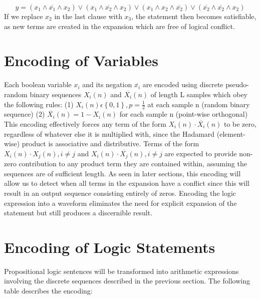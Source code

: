 \documentclass[reqno]{amsart}
\theoremstyle{definition}
\theoremstyle{remark}
\begin{document}
\begin{equation}
y = (x_1\wedge\overline{x_1}\wedge x_2) \vee (x_1 \wedge \overline{x_2} \wedge x_2) \vee (x_1\wedge x_2\wedge \overline{x_2} ) \vee (\overline{x_2}\wedge \overline{x_2}\wedge x_2)
\end{equation}
\newline
\noindent
If we replace $x_2$ in the last clause with $x_3$, the statement then becomes satisfiable, as new terms are created in the expansion which are free of logical conflict.


\section{Encoding of Variables}
\noindent
Each boolean variable $x_i$ and its negation $\overline{x_i}$ are encoded using discrete pseudo-random binary 
sequences $X_i(n)$ and $\overline{X_i}(n)$ of length L samples which obey the following
rules: \newline\newline
(1) $X_i(n) \epsilon\left \{ 0,1 \right \}, p=\frac{1}{2}$ at each sample n (random binary sequence) \newline
(2) $\overline{X_i}(n) =  1-X_i(n)$  for each sample n (point-wise orthogonal) \newline
\newline
\noindent
This encoding effectively forces any term of the form $X_i(n) \cdot \overline{X_i}(n)$ to be zero, regardless
of whatever else it is multiplied with, since the Hadamard (element-wise) product is associative and distributive. Terms of the form $X_i(n) \cdot X_j(n), i \neq j$ and $X_i(n) \cdot \overline{X_j}(n), i \neq j$ are expected to provide non-zero contribution to any product term they are contained within, assuming the sequences are of sufficient length.
As seen in later sections, this encoding will allow us to detect when all terms in the expansion have a conflict since this will result in an output sequence consisting entirely of zeros. Encoding the logic expression into a waveform eliminates the need for explicit 
expansion of the statement but still produces a discernible result.
\newline


\section{Encoding of Logic Statements}
\noindent
Propositional logic sentences will be transformed into arithmetic expressions involving the discrete sequences
described in the previous section. The following table describes the encoding:
\end{document}
